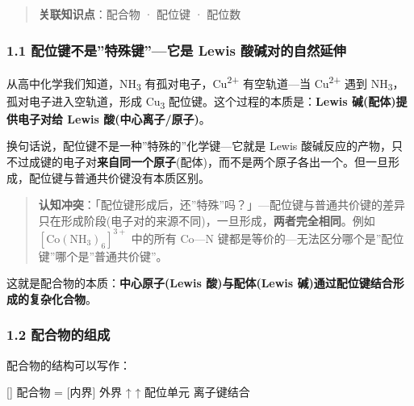 \documentclass[a4paper,11pt]{ctexart}
\newenvironment{Shaded}{}{}
\newenvironment{Highlighting}{}{}
\newcommand{\NormalTok}[1]{#1}
\newcommand{\箭}{\ensuremath{\rightarrow}}
\newcommand{\左箭}{\ensuremath{\leftarrow}}
\newcommand{\上箭}{\ensuremath{\uparrow}}
\newcommand{\下箭}{\ensuremath{\downarrow}}
\newcommand{\衡}{\ensuremath{\rightleftharpoons}}
\newcommand{\双箭}{\ensuremath{\leftrightarrow}}
\newcommand{\约等于}{\ensuremath{\approx}}
\newcommand{\小于等于}{\ensuremath{\leq}}
\newcommand{\大于等于}{\ensuremath{\geq}}
\newcommand{\不等于}{\ensuremath{\neq}}
\newcommand{\西格马}{\ensuremath{\sigma}}
\newcommand{\派}{\ensuremath{\pi}}
\begin{document}
\begin{quote}
\textbf{关联知识点}：配合物 · 配位键 · 配位数
\end{quote}

\subsubsection{1.1 配位键不是''特殊键''---它是 Lewis 酸碱对的自然延伸}\label{ux914dux4f4dux952eux4e0dux662fux7279ux6b8aux952eux5b83ux662f-lewis-ux9178ux78b1ux5bf9ux7684ux81eaux7136ux5ef6ux4f38}

从高中化学我们知道，NH\textsubscript{3} 有孤对电子，Cu\textsuperscript{2+} 有空轨道---当 Cu\textsuperscript{2+} 遇到 NH\textsubscript{3}，孤对电子进入空轨道，形成 Cu\textsubscript{3} 配位键。这个过程的本质是：\textbf{Lewis 碱(配体)提供电子对给 Lewis 酸(中心离子/原子)}。

换句话说，配位键不是一种''特殊的''化学键---它就是 Lewis 酸碱反应的产物，只不过成键的电子对\textbf{来自同一个原子}(配体)，而不是两个原子各出一个。但一旦形成，配位键与普通共价键没有本质区别。

\begin{quote}
\textbf{认知冲突}：「配位键形成后，还''特殊''吗？」---配位键与普通共价键的差异只在形成阶段(电子对的来源不同)，一旦形成，\textbf{两者完全相同}。例如 \([\mathrm{Co(NH_3)_6}]^{3+}\) 中的所有 Co---N 键都是等价的---无法区分哪个是''配位键''哪个是''普通共价键''。
\end{quote}

这就是配合物的本质：\textbf{中心原子(Lewis 酸)与配体(Lewis 碱)通过配位键结合形成的复杂化合物}。

\subsubsection{1.2 配合物的组成}\label{ux914dux5408ux7269ux7684ux7ec4ux6210}

配合物的结构可以写作：

\begin{Shaded}
\begin{Highlighting}[]
\NormalTok{配合物 = [内界] 外界}
\NormalTok{ ↑ ↑}
\NormalTok{ 配位单元 离子键结合}
\end{Highlighting}
\end{Shaded}
\end{document}
